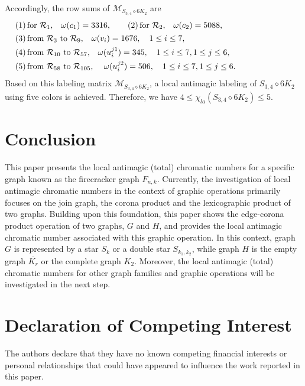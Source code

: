 \documentclass[12pt]{article}
\begin{document}
Accordingly, the row sums of $\boldsymbol{\mathcal{M}}_{S_{3,4}\diamond 6K_{2}}$ are
\begin{equation*}
\begin{array}{l}
(1)\,\text{for $\mathcal{R}_{1}$,} \quad\omega(c_{1})=3316, \quad\quad(2)\,\text{for $\mathcal{R}_{2}$,} \quad\omega(c_{2})=5088,\\[4pt]
(3)\,\text{from $\mathcal{R}_{3}$ to $\mathcal{R}_{9}$,} \quad\omega(v_{i})=1676,\quad 1\leq i\leq 7,\\[4pt]
(4)\,\text{from $\mathcal{R}_{10}$ to $\mathcal{R}_{57}$,} \quad\omega(u_{i}^{j1})=345 ,\quad 1\leq i\leq 7, 1\leq j\leq 6,\hspace{7.5em}\\[4pt]
(5)\,\text{from $\mathcal{R}_{58}$ to $\mathcal{R}_{105}$, }
\quad\omega(u_{i}^{j2})=506, \quad 1\leq i\leq 7, 1\leq j\leq 6.
\end{array}
\end{equation*}
Based on this labeling matrix $\boldsymbol{\mathcal{M}}_{S_{3,4}\diamond 6K_{2}}$, a local antimagic labeling of $S_{3,4}\diamond 6K_{2}$ using five colors is achieved.  Therefore, we have $4\leq\chi_{la}(S_{3,4}\diamond 6K_{2})\leq 5$.

\section{Conclusion}
This paper presents the local antimagic (total) chromatic numbers for a specific graph known as the firecracker graph $F_{n,k}$. Currently, the investigation of local antimagic chromatic numbers in the context of graphic operations primarily focuses on the join graph, the corona product and the lexicographic product of two graphs. Building upon this foundation, this paper shows the edge-corona product operation of two graphs, $G$ and $H$, and provides the local antimagic chromatic number associated with this graphic operation. In this context, graph $G$ is represented by a star $S_{k}$ or a double star $S_{k_{1},k_{2}}$, while graph $H$ is the empty graph $\overline{K_{r}}$ or the complete graph $K_2$. Moreover, the local antimagic (total) chromatic numbers for other graph families and graphic operations will be investigated in the next step.


\section{Declaration of Competing Interest}
The authors declare that they have  no known competing financial interests or personal relationships that could have appeared to influence the work reported in this paper.
\end{document}
